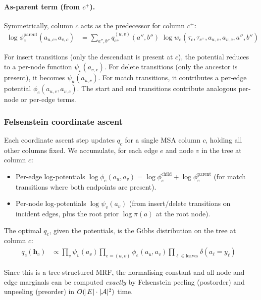 \paragraph{As-parent term (from $c^+$).}
Symmetrically, column $c$ acts as the predecessor for column $c^+$:
\begin{align}
\log \phi_e^{\mathrm{parent}}(a_{u,c}, a_{v,c})
 &= \sum_{a'', b''} q_{c^+}^{(u,v)}(a'', b'')\;
    \log w_e(\tau_c, \tau_{c^+\!}, a_{u,c}, a_{v,c}, a'', b'')
\label{eq:pot-parent-tkf}
\end{align}

For insert transitions (only the descendant is present at $c$),
the potential reduces to a per-node function $\psi_v(a_{v,c})$.
For delete transitions (only the ancestor is present), it becomes $\psi_u(a_{u,c})$.
For match transitions, it contributes a per-edge potential $\phi_e(a_{u,c}, a_{v,c})$.
The start and end transitions contribute analogous per-node or per-edge terms.

\subsubsection{Felsenstein coordinate ascent}
\label{sec:felsenstein-update-tkf}

Each coordinate ascent step updates $q_c$ for a single MSA column $c$,
holding all other columns fixed.
We accumulate, for each edge $e$ and node $v$ in the tree at column $c$:
\begin{itemize}
\item Per-edge log-potentials
  $\log \phi_e(a_u, a_v) = \log \phi_e^{\mathrm{child}} + \log \phi_e^{\mathrm{parent}}$
  (for match transitions where both endpoints are present).
\item Per-node log-potentials
  $\log \psi_v(a_v)$ (from insert/delete transitions on incident edges,
  plus the root prior $\log \pi(a)$ at the root node).
\end{itemize}

The optimal $q_c$, given the potentials, is the Gibbs distribution on the
tree at column $c$:
\begin{align}
q_c(\mathbf{h}_c) &\propto \prod_v \psi_v(a_v) \prod_{e=(u,v)} \phi_e(a_u, a_v)
  \prod_{\ell \in \mathrm{leaves}} \delta(a_\ell = y_\ell)
\label{eq:q-gibbs-tkf}
\end{align}

Since this is a tree-structured MRF, the normalising constant and all
node and edge marginals can be computed \emph{exactly} by Felsenstein
peeling (postorder) and unpeeling (preorder) in $O(|E| \cdot |\mathcal{A}|^2)$ time.

